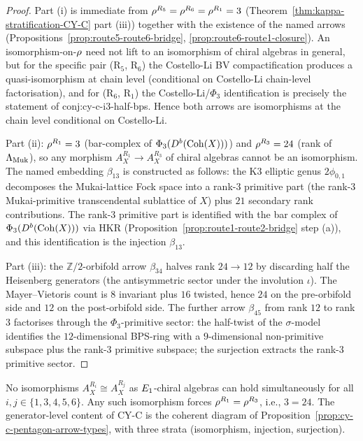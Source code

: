 \begin{proof}
Part (i) is immediate from $\rho^{R_5} = \rho^{R_6} = \rho^{R_1} = 3$ (Theorem~\ref{thm:kappa-stratification-CY-C}
part (iii)) together with the existence of the named arrows (Propositions~\ref{prop:route5-route6-bridge},
\ref{prop:route6-route1-closure}). An isomorphism-on-$\rho$ need not lift to an isomorphism of chiral algebras
in general, but for the specific pair (R$_5$, R$_6$) the Costello-Li BV compactification produces a
quasi-isomorphism at chain level (conditional on Costello-Li chain-level factorisation), and for
(R$_6$, R$_1$) the Costello-Li/$\Phi_3$ identification is precisely the statement of conj:cy-c-i3-half-bps.
Hence both arrows are isomorphisms at the chain level conditional on Costello-Li.

Part (ii): $\rho^{R_1} = 3$ (bar-complex of $\Phi_3(D^b(\mathrm{Coh}(X)))$) and $\rho^{R_3} = 24$ (rank of $\Lambda_{\mathrm{Muk}}$),
so any morphism $A_X^{R_1} \to A_X^{R_3}$ of chiral algebras cannot be an isomorphism. The named embedding
$\beta_{13}$ is constructed as follows: the K3 elliptic genus $2\phi_{0, 1}$ decomposes the Mukai-lattice
Fock space into a rank-$3$ primitive part (the rank-$3$ Mukai-primitive transcendental sublattice of $X$) plus
$21$ secondary rank contributions. The rank-$3$ primitive part is identified with the bar complex of
$\Phi_3(D^b(\mathrm{Coh}(X)))$ via HKR (Proposition~\ref{prop:route1-route2-bridge} step (a)), and this identification
is the injection $\beta_{13}$.

Part (iii): the $\mathbb{Z}/2$-orbifold arrow $\beta_{34}$ halves rank $24 \to 12$ by discarding half the
Heisenberg generators (the antisymmetric sector under the involution $\iota$). The Mayer--Vietoris count is
\(8\) invariant plus \(16\) twisted, hence \(24\) on the pre-orbifold
side and \(12\) on the post-orbifold side. The further arrow
$\beta_{45}$ from rank $12$ to rank $3$ factorises through the $\Phi_3$-primitive sector: the half-twist
of the $\sigma$-model identifies the $12$-dimensional BPS-ring with a $9$-dimensional non-primitive subspace
plus the rank-$3$ primitive subspace; the surjection extracts the rank-$3$ primitive sector.
\end{proof}

\begin{corollary}
\label{cor:six-way-isomorphism-falsified}
No isomorphisms $A_X^{R_i} \cong A_X^{R_j}$ as $E_{1}$-chiral algebras can hold simultaneously for all
$i, j \in \{1, 3, 4, 5, 6\}$. Any such isomorphism forces $\rho^{R_1} = \rho^{R_3}$, i.e., $3 = 24$.
The generator-level content of CY-C is the coherent diagram of Proposition~\ref{prop:cy-c-pentagon-arrow-types},
with three strata (isomorphism, injection, surjection).
\end{corollary}

